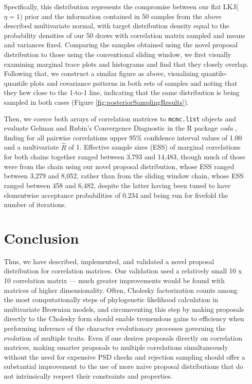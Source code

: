 \documentclass[10pt]{article}
\begin{document}
Specifically, this distribution represents the compromise between our flat LKJ($\eta = 1$) prior and the information contained in 50 samples from the above described multivariate normal, with target distribution density equal to the probability densities of our 50 draws with correlation matrix sampled and means and variances fixed. Comparing the samples obtained using the novel proposal distribution to those using the conventional sliding window, we first visually examining marginal trace plots and histograms and find that they closely overlap. Following that, we construct a similar figure as above, visualizing quantile-quantile plots and covariance patterns in both sets of samples and noting that they hew close to the 1-to-1 line, indicating that the same distribution is being sampled in both cases (Figure \ref{fig:posteriorSamplingResults}).

Then, we coerce both arrays of correlation matrices to \texttt{mcmc.list} objects and evaluate Gelman and Rubin's Convergence Diagnostic \citep{gelmanInferenceIterativeSimulation1992} in the R package \textit{coda} \citep{plummerCODAConvergenceDiagnosis2006}, finding for all pairwise correlations upper 95\% confidence interval values of 1.00 and a multivariate \(\hat{R}\) of 1. Effective sample sizes (ESS) of marginal correlations for both chains together ranged between 3,793 and 14,483, though much of those were from the chain using our novel proposal distribution, whose ESS ranged between 3,279 and 8,052, rather than from the sliding window chain, whose ESS ranged between 458 and 6,482, despite the latter having been tuned to have elementwise acceptance probabilities of 0.234 and being run for fivefold the number of iterations. 

\clearpage

\section{Conclusion}

Thus, we have described, implemented, and validated a novel proposal distribution for correlation matrices. Our validation used a relatively small 10 x 10 correlation matrix --- much greater improvements would be found with matrices of higher dimensionality. Often, Cholesky factorization counts among the most computationally steps of phylogenetic likelihood calculation in multivariate Brownian models, and circumventing this step by making proposals directly to the Cholesky form should enable tremendous gains to efficiency when performing inference of the character evolutionary processes governing the evolution of multiple traits. Even if one desires proposals directly on correlation matrices, making smarter proposals to multiple correlations simultaneously without the need for expensive PSD checks and rejection sampling should offer a substantial improvement to the use of more naive proposal distributions that do not intrinsically respect their constraints and properties.
\end{document}
